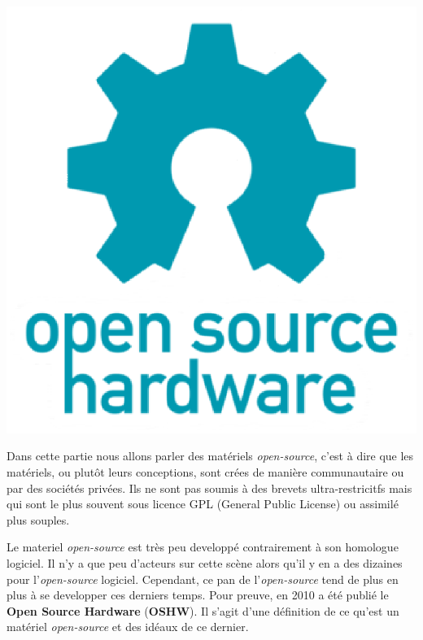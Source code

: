  \begin{minipage}{0.40\linewidth}
 \includegraphics[scale=0.3]{oshw-logo.eps}
 \end{minipage}\hfill
 \begin{minipage}{0.55\linewidth}
Dans cette partie nous allons parler des matériels \textit{open-source}, c'est à dire que les matériels, ou plutôt leurs conceptions, sont crées de manière communautaire ou par des sociétés privées. Ils ne sont pas soumis à des brevets ultra-restricitfs mais qui sont le plus souvent sous licence GPL (General Public License) ou assimilé plus souples. 
 \end{minipage}
Le materiel \textit{open-source} est très peu developpé contrairement à son homologue logiciel. Il n'y a que peu d'acteurs sur cette scène alors qu'il y en a des dizaines pour l'\textit{open-source} logiciel. Cependant, ce pan de l'\textit{open-source} tend de plus en plus à se developper ces derniers temps. Pour preuve, en 2010 a été publié le \textbf{Open Source Hardware} (\textbf{OSHW}). Il s'agit d'une définition de ce qu'est un matériel \textit{open-source} et des idéaux de ce dernier.


